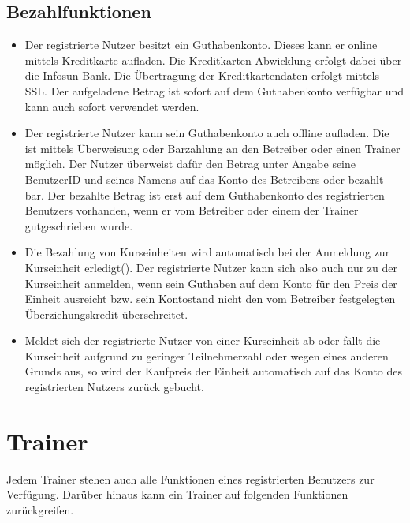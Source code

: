 \documentclass[a4paper]{scrreprt}
\newcounter{Lc}
\newcounter{Hc}
\newcommand{\stepHc}{\stepcounter{Hc}\setcounter{Lc}{0}}
\begin{document}
\subsection{Bezahlfunktionen}
\begin{itemize}
	\item {}
	Der registrierte Nutzer besitzt ein Guthabenkonto. Dieses kann er online mittels Kreditkarte aufladen. Die Kreditkarten Abwicklung erfolgt dabei
	über die Infosun-Bank. Die Übertragung der Kreditkartendaten erfolgt mittels SSL. Der aufgeladene Betrag ist sofort auf dem Guthabenkonto verfügbar und kann auch sofort verwendet werden.
	\item {}
	Der registrierte Nutzer kann sein Guthabenkonto auch offline aufladen. Die ist mittels Überweisung oder Barzahlung an den Betreiber oder einen Trainer möglich. 
	Der Nutzer überweist dafür den Betrag unter Angabe seine BenutzerID und seines Namens  auf das Konto des Betreibers oder bezahlt bar. Der bezahlte Betrag ist erst auf dem Guthabenkonto des registrierten Benutzers vorhanden, wenn er vom Betreiber oder einem der Trainer gutgeschrieben wurde.
	\item {}
	Die Bezahlung von Kurseinheiten wird automatisch bei der Anmeldung zur Kurseinheit erledigt(). Der registrierte Nutzer kann sich also auch nur zu der Kurseinheit anmelden, wenn sein Guthaben auf dem Konto für den Preis der Einheit ausreicht bzw. sein Kontostand nicht den vom Betreiber festgelegten Überziehungskredit überschreitet.
	\item {}
	Meldet sich der registrierte Nutzer von einer Kurseinheit ab oder fällt die Kurseinheit aufgrund zu geringer Teilnehmerzahl oder wegen eines anderen Grunds aus, so wird der Kaufpreis der Einheit automatisch auf das Konto des registrierten Nutzers zurück gebucht.
\end{itemize}	

\section{Trainer}
Jedem Trainer stehen auch alle Funktionen eines registrierten Benutzers zur Verfügung. Darüber hinaus kann ein Trainer auf folgenden Funktionen zurückgreifen.
\stepHc
\end{document}
